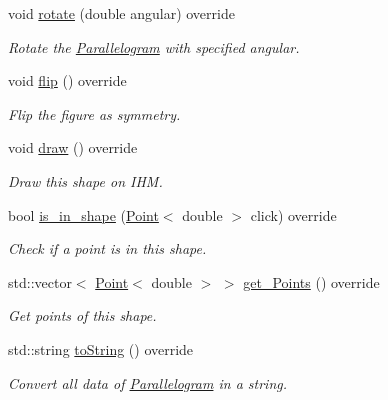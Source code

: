 \begin{DoxyCompactItemize}
void \hyperlink{classParallelogram_ac498f6a15dea236ecc49bece023d17b0}{rotate} (double angular) override
\begin{DoxyCompactList}\small\item\em Rotate the \hyperlink{classParallelogram}{Parallelogram} with specified angular. \end{DoxyCompactList}\item 
\mbox{\label{classParallelogram_a51f002e90b7bf6c5d875cc094c22f7c1}} 
void \hyperlink{classParallelogram_a51f002e90b7bf6c5d875cc094c22f7c1}{flip} () override
\begin{DoxyCompactList}\small\item\em Flip the figure as symmetry. \end{DoxyCompactList}\item 
\mbox{\label{classParallelogram_a73e3657bf024787b57ccdd8035a6fdef}} 
void \hyperlink{classParallelogram_a73e3657bf024787b57ccdd8035a6fdef}{draw} () override
\begin{DoxyCompactList}\small\item\em Draw this shape on I\+HM. \end{DoxyCompactList}\item 
bool \hyperlink{classParallelogram_a9ba441d86d6311bba489e998c87dddf6}{is\+\_\+in\+\_\+shape} (\hyperlink{classPoint}{Point}$<$ double $>$ click) override
\begin{DoxyCompactList}\small\item\em Check if a point is in this shape. \end{DoxyCompactList}\item 
std\+::vector$<$ \hyperlink{classPoint}{Point}$<$ double $>$ $>$ \hyperlink{classParallelogram_a17c9986712806a8b07d90e444e0a543d}{get\+\_\+\+Points} () override
\begin{DoxyCompactList}\small\item\em Get points of this shape. \end{DoxyCompactList}\item 
std\+::string \hyperlink{classParallelogram_a9caae0044f23d8a1e87b1a78d852c37f}{to\+String} () override
\begin{DoxyCompactList}\small\item\em Convert all data of \hyperlink{classParallelogram}{Parallelogram} in a string. \end{DoxyCompactList}\end{DoxyCompactItemize}


